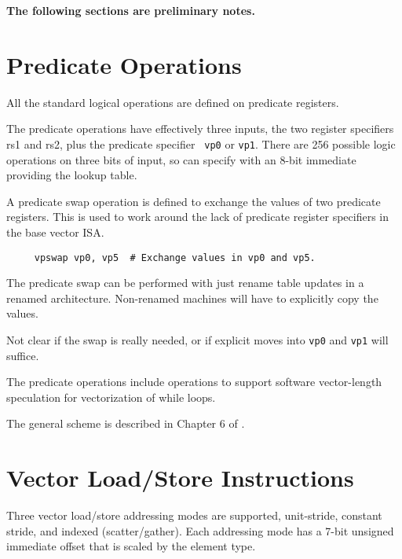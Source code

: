 {\bf The following sections are preliminary notes.}

\section{Predicate Operations}

All the standard logical operations are defined on predicate
registers.

\begin{commentary}
  The predicate operations have effectively three inputs, the two
  register specifiers rs1 and rs2, plus the predicate specifier {\tt
    vp0} or {\tt vp1}.  There are 256 possible logic operations on
  three bits of input, so can specify with an 8-bit immediate
  providing the lookup table.
\end{commentary}

A predicate swap operation is defined to exchange the values of two
predicate registers.  This is used to work around the lack of
predicate register specifiers in the base vector ISA.

\begin{verbatim}
     vpswap vp0, vp5  # Exchange values in vp0 and vp5.
\end{verbatim}

\begin{commentary}
  The predicate swap can be performed with just rename table updates
  in a renamed architecture.  Non-renamed machines will have to
  explicitly copy the values.
\end{commentary}

\begin{discussion}
  Not clear if the swap is really needed, or if explicit moves into
  {\tt vp0} and {\tt vp1} will suffice.
\end{discussion}

The predicate operations include operations to support software
vector-length speculation for vectorization of while loops.

\begin{commentary}
  The general scheme is described in Chapter 6 of \cite{krstephd}.
\end{commentary}

\section{Vector Load/Store Instructions}

Three vector load/store addressing modes are supported, unit-stride,
constant stride, and indexed (scatter/gather).  Each addressing mode
has a 7-bit unsigned immediate offset that is scaled by the element
type.

